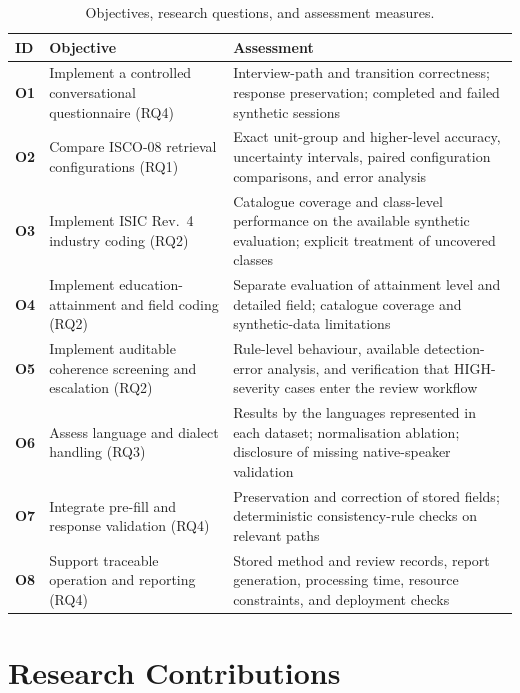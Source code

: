 \begin{table}[htbp]
\centering
\caption{Objectives, research questions, and assessment measures.}
\label{tab:ch1-objectives}
\small\renewcommand{\arraystretch}{1.25}
\begin{tabular}{>{\centering\bfseries}p{0.5cm}
                >{\raggedright}p{5.1cm}
                >{\raggedright\arraybackslash}p{6.3cm}}
\toprule
\textbf{ID} & \textbf{Objective} & \textbf{Assessment} \\
\midrule
O1 & Implement a controlled conversational questionnaire (RQ4) &
  Interview-path and transition correctness; response preservation;
  completed and failed synthetic sessions \\
O2 & Compare ISCO-08 retrieval configurations (RQ1) &
  Exact unit-group and higher-level accuracy, uncertainty intervals,
  paired configuration comparisons, and error analysis \\
O3 & Implement ISIC Rev.~4 industry coding (RQ2) &
  Catalogue coverage and class-level performance on the available
  synthetic evaluation; explicit treatment of uncovered classes \\
O4 & Implement education-attainment and field coding (RQ2) &
  Separate evaluation of attainment level and detailed field;
  catalogue coverage and synthetic-data limitations \\
O5 & Implement auditable coherence screening and escalation (RQ2) &
  Rule-level behaviour, available detection-error analysis, and
  verification that HIGH-severity cases enter the review workflow \\
O6 & Assess language and dialect handling (RQ3) &
  Results by the languages represented in each dataset;
  normalisation ablation; disclosure of missing native-speaker validation \\
O7 & Integrate pre-fill and response validation (RQ4) &
  Preservation and correction of stored fields; deterministic
  consistency-rule checks on relevant paths \\
O8 & Support traceable operation and reporting (RQ4) &
  Stored method and review records, report generation, processing time,
  resource constraints, and deployment checks \\
\bottomrule
\end{tabular}
\end{table}

\section{Research Contributions}
\label{sec:contributions}

